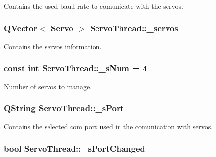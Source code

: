 Contains the used baud rate to comunicate with the servos. 

\hypertarget{a00008_a1ac6662fe6d198b5971ae0ffa7ddfcfd}{}
\subsubsection[{\+\_\+servos}]{\setlength{\rightskip}{0pt plus 5cm}Q\+Vector$<$ {\bf Servo} $>$ Servo\+Thread\+::\+\_\+servos\hspace{0.3cm}{\ttfamily [private]}}\label{a00008_a1ac6662fe6d198b5971ae0ffa7ddfcfd}


Contains the servos information. 

\hypertarget{a00008_a334e0c5bca9ccb2585cb82bce60ea42f}{}
\subsubsection[{\+\_\+s\+Num}]{\setlength{\rightskip}{0pt plus 5cm}const int Servo\+Thread\+::\+\_\+s\+Num = 4\hspace{0.3cm}{\ttfamily [private]}}\label{a00008_a334e0c5bca9ccb2585cb82bce60ea42f}


Number of servos to manage. 

\hypertarget{a00008_ac9a614aa1518efb49b0a06636bd1bdbf}{}
\subsubsection[{\+\_\+s\+Port}]{\setlength{\rightskip}{0pt plus 5cm}Q\+String Servo\+Thread\+::\+\_\+s\+Port\hspace{0.3cm}{\ttfamily [private]}}\label{a00008_ac9a614aa1518efb49b0a06636bd1bdbf}


Contains the selected com port used in the comunication with servos. 

\hypertarget{a00008_a6e803432db01b10ed975132315280fd3}{}
\subsubsection[{\+\_\+s\+Port\+Changed}]{\setlength{\rightskip}{0pt plus 5cm}bool Servo\+Thread\+::\+\_\+s\+Port\+Changed\hspace{0.3cm}{\ttfamily [private]}}\label{a00008_a6e803432db01b10ed975132315280fd3}


